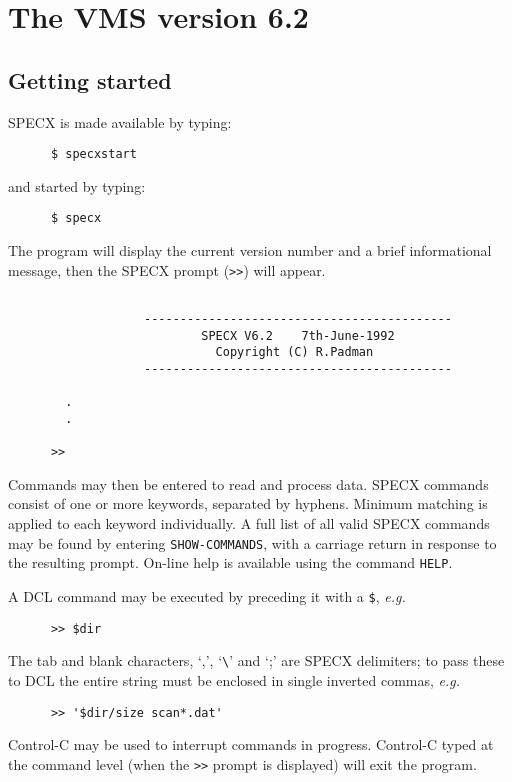 \section {The VMS version 6.2}
\subsection {Getting started}

SPECX is made available by typing:
\begin{verbatim}
      $ specxstart
\end{verbatim}
and started by typing:
\begin{verbatim}
      $ specx 
\end{verbatim}
The program will display the current version number and
a brief informational message, then the SPECX prompt ({\tt>>}) will appear.

\begin{verbatim}

                   -------------------------------------------
                           SPECX V6.2    7th-June-1992
                             Copyright (C) R.Padman
                   -------------------------------------------

        .
        .

      >> 
\end{verbatim}

Commands may then be entered to read and process data.
SPECX commands consist of one or more keywords, separated
by hyphens. Minimum matching is applied to each keyword
individually. A full list of all valid SPECX commands
may be found by entering {\tt SHOW-COMMANDS}, with a carriage return
in response to the resulting prompt. On-line help is available
using the command {\tt HELP}.

A DCL command may be executed by preceding it with a {\tt \$}, {\em e.g.}

\begin{verbatim}
      >> $dir
\end{verbatim}

The tab and blank characters, `,', `\verb+\+' and `;' are SPECX delimiters;
to pass these to DCL the entire string must be enclosed in single 
inverted commas, {\em e.g.}

\begin{verbatim}
      >> '$dir/size scan*.dat'
\end{verbatim}

Control-C may be used to interrupt commands in progress.
Control-C typed at the command level (when the
{\tt>>} prompt is displayed) will exit the program.

